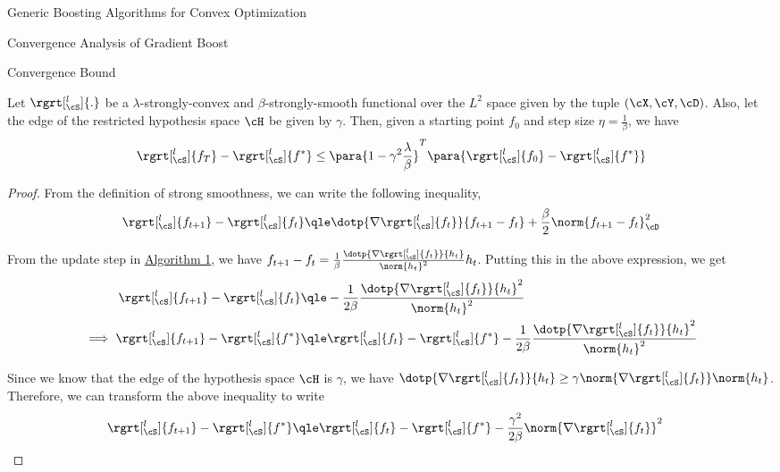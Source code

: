 \documentclass{article}
\begin{document}
\begin{psection}{Generic Boosting Algorithms for Convex Optimization}
\begin{psubsection}{Convergence Analysis of Gradient Boost}
\begin{pssubsection}{Convergence Bound}
			\begin{theorem}
				Let $\rgrt[_\cS^l]{.}$ be a $\lambda$-strongly-convex and $\beta$-strongly-smooth functional over the $L^2$ space given by the tuple $(\cX, \cY, \cD)$. Also, let the edge of the restricted hypothesis space $\cH$ be given by $\gamma$. Then, given a starting point $f_0$ and step size $\eta = \frac{1}{\beta}$, we have
				\begin{equation}
					\rgrt[_\cS^l]{f_T} - \rgrt[_\cS^l]{f^\ast} \leq \para{1 - \gamma^2 \frac{\lambda}{\beta}}^T \para{\rgrt[_\cS^l]{f_0} - \rgrt[_\cS^l]{f^\ast}}
					\label{eq:regret-bound-1}
				\end{equation}
			\end{theorem}

			\begin{proof}
				From the definition of strong smoothness, we can write the following inequality,
				\begin{align*}
					\rgrt[_\cS^l]{f_{t + 1}} - \rgrt[_\cS^l]{f_{t}} \qle \dotp{\nabla \rgrt[_\cS^l]{f_{t}}}{f_{t+1} - f_t} +\frac{\beta}{2} \norm{f_{t+1} - f_t}_\cD^2
				\end{align*}

				From the update step in \hyperlink{algo:1}{Algorithm 1}, we have $f_{t + 1} - f_t = \frac{1}{\beta} \frac{\dotp{\nabla \rgrt[_\cS^l]{f_t}}{h_t}}{\norm{h_t}^2} h_t$. Putting this in the above expression, we get
				\begin{align*}
					\rgrt[_\cS^l]{f_{t + 1}} - \rgrt[_\cS^l]{f_t} &\qle - \frac{1}{2 \beta} \frac{\dotp{\nabla \rgrt[_\cS^l]{f_t}}{h_t}^2}{\norm{h_t}^2} \\
					\implies \rgrt[_\cS^l]{f_{t + 1}} - \rgrt[_\cS^l]{f^{\ast}} &\qle \rgrt[_\cS^l]{f_t} - \rgrt[_\cS^l]{f^\ast} - \frac{1}{2 \beta} \frac{\dotp{\nabla \rgrt[_\cS^l]{f_t}}{h_t}^2}{\norm{h_t}^2}
				\end{align*}

				Since we know that the edge of the hypothesis space $\cH$ is $\gamma$, we have $\dotp{\nabla \rgrt[_\cS^l]{f_t}}{h_t} \ge \gamma \norm{\nabla \rgrt[_\cS^l]{f_t}} \norm{h_t}$. Therefore, we can transform the above inequality to write
				\begin{align*}
					\rgrt[_\cS^l]{f_{t + 1}} - \rgrt[_\cS^l]{f^{\ast}} &\qle \rgrt[_\cS^l]{f_t} - \rgrt[_\cS^l]{f^\ast} - \frac{\gamma^2}{2 \beta} \norm{\nabla \rgrt[_\cS^l]{f_t}}^2
				\end{align*}


\end{proof}
\end{pssubsection}
\end{psubsection}
\end{psection}
\end{document}
